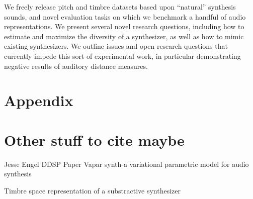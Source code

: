 We freely release pitch and timbre datasets based upon ``natural'' synthesis sounds, and novel evaluation tasks on which we benchmark a handful of audio representations. We present several novel research questions, including how to estimate and maximize the diversity of a synthesizer, as well as how to mimic existing synthesizers. We outline issues and open research questions that currently impede this sort of experimental work, in particular demonstrating negative results of auditory distance measures.

%
%

\iffalse
\section{Appendix}

\section{Other stuff to cite maybe}








Jesse Engel DDSP Paper \cite{engel2020ddsp}
Vapar synth-a variational parametric model for audio synthesis \cite{subramani2020vapar}

Timbre space representation of a substractive synthesizer \cite{vahidi2020timbre}

